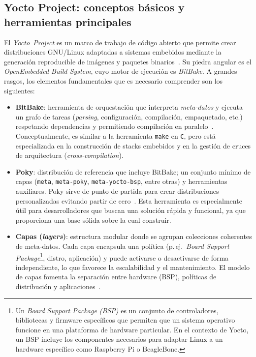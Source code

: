 \subsection{Yocto Project: conceptos básicos y herramientas principales}

El \textit{Yocto Project} es un marco de trabajo de código abierto que permite crear distribuciones GNU/Linux adaptadas a sistemas embebidos mediante la generación reproducible de imágenes y paquetes binarios \cite{yocto_overview_2025}. Su piedra angular es el \textit{OpenEmbedded Build System}, cuyo motor de ejecución es \textit{BitBake}.  A grandes rasgos, los elementos fundamentales que es necesario comprender son los siguientes:

\begin{itemize}
    \item \textbf{BitBake}: herramienta de orquestación que interpreta \emph{meta‐datos} y ejecuta un grafo de tareas (\textit{parsing}, configuración, compilación, empaquetado, etc.) respetando dependencias y permitiendo compilación en paralelo \cite{bitbake_manual_2025}.  Conceptualmente, es similar a la herramienta \texttt{make} en \texttt{C}, pero está especializada en la construcción de stacks embebidos y en la gestión de cruces de arquitectura (\emph{cross‑compilation}).
      
    \item \textbf{Poky}: distribución de referencia que incluye BitBake; un conjunto mínimo de capas (\texttt{meta}, \texttt{meta‐poky}, \texttt{meta‐yocto‐bsp}, entre otras) y herramientas auxiliares.  Poky sirve de punto de partida para crear distribuciones personalizadas evitando partir de cero \cite{yocto_overview_2025}. Esta herramienta es especialmente útil para desarrolladores que buscan una solución rápida y funcional, ya que proporciona una base sólida sobre la cual construir.
    
    \item \textbf{Capas (\emph{layers})}: estructura modular donde se agrupan colecciones coherentes de meta‑datos.  Cada capa encapsula una política (p.\,ej.\ \textit{Board Support Package}\footnote{Un \textit{Board Support Package (BSP)} es un conjunto de controladores, bibliotecas y firmware específicos que permiten que un sistema operativo funcione en una plataforma de hardware particular. En el contexto de Yocto, un BSP incluye los componentes necesarios para adaptar Linux a un hardware específico como Raspberry Pi o BeagleBone.}, distro, aplicación) y puede activarse o desactivarse de forma independiente, lo que favorece la escalabilidad y el mantenimiento.  El modelo de capas fomenta la separación entre hardware (BSP), políticas de distribución y aplicaciones \cite{yocto_overview_2025}.
    

\end{itemize}
